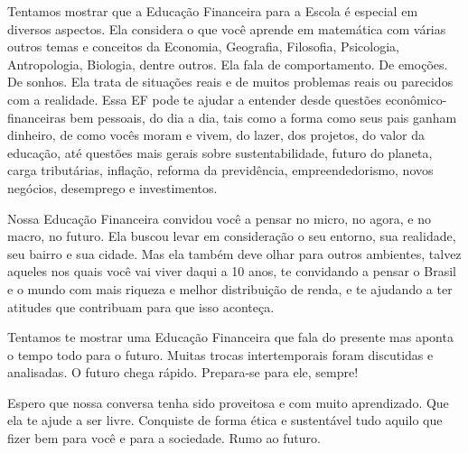 Tentamos mostrar que a Educação Financeira para a Escola é especial em diversos aspectos. Ela considera o que você aprende em matemática com várias outros temas e conceitos da Economia, Geografia, Filosofia, Psicologia, Antropologia, Biologia, dentre outros. Ela fala de comportamento. De emoções. De sonhos. Ela trata de situações reais e de muitos problemas reais ou parecidos com a realidade. Essa EF pode te ajudar a entender desde questões econômico-financeiras bem pessoais, do dia a dia, tais como a forma como seus pais ganham dinheiro, de como vocês moram e vivem, do lazer, dos projetos, do valor da educação, até questões mais gerais sobre sustentabilidade, futuro do planeta, carga tributárias, inflação, reforma da previdência, empreendedorismo, novos negócios, desemprego e investimentos. 

Nossa Educação Financeira convidou você a pensar no micro, no agora, e no macro, no futuro. Ela buscou levar em consideração o seu entorno, sua realidade, seu bairro e sua cidade. Mas ela também deve olhar para outros ambientes, talvez aqueles nos quais você vai viver daqui a 10 anos, te convidando a pensar o Brasil e o mundo com mais riqueza e melhor distribuição de renda, e te ajudando a ter atitudes que contribuam para que isso aconteça.

Tentamos te mostrar uma Educação Financeira que fala do presente mas aponta o tempo todo para o futuro. Muitas trocas intertemporais foram discutidas e analisadas. O futuro chega rápido. Prepara-se para ele, sempre!

Espero que nossa conversa tenha sido proveitosa e com muito aprendizado. Que ela te ajude a ser livre. Conquiste de forma ética e sustentável tudo aquilo que fizer bem para você e para a sociedade. Rumo ao futuro.



\clearpage


